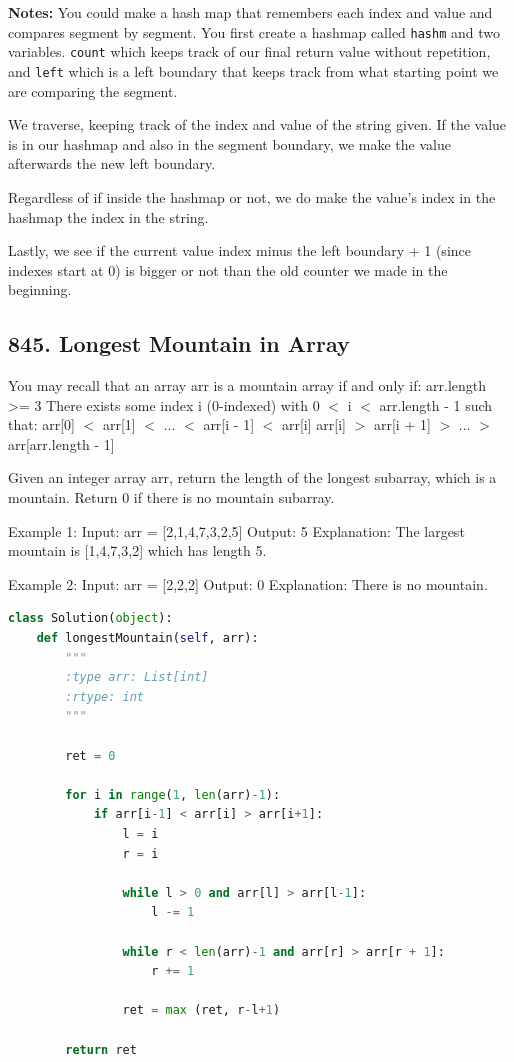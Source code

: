 \documentclass[11pt]{article}
\begin{document}
\noindent \textbf{Notes:} You could make a hash map that remembers each index and value and compares segment by segment. You first create a hashmap called \texttt{hashm} and two variables. \texttt{count} which keeps track of our final return value without repetition, and \texttt{left} which is a left boundary that keeps track from what starting point we are comparing the segment.

\noindent We traverse, keeping track of the index and value of the string given. If the value is in our hashmap and also in the segment boundary, we make the value afterwards the new left boundary.

\noindent Regardless of if inside the hashmap or not, we do make the value's index in the hashmap the index in the string. 

\noindent Lastly, we see if the current value index minus the left boundary + 1 (since indexes start at 0) is bigger or not than the old counter we made in the beginning. 


\subsection*{845. Longest Mountain in Array}
You may recall that an array arr is a mountain array if and only if: arr.length >= 3
There exists some index i (0-indexed) with 0 $<$ i $<$ arr.length - 1 such that:
        arr[0] $<$ arr[1] $<$ ... $<$ arr[i - 1] $<$ arr[i]
        arr[i] $>$ arr[i + 1] $>$ ... $>$ arr[arr.length - 1]

Given an integer array arr, return the length of the longest subarray, which is a mountain. Return 0 if there is no mountain subarray.

 

Example 1:
Input: arr = [2,1,4,7,3,2,5]
Output: 5
Explanation: The largest mountain is [1,4,7,3,2] which has length 5.

Example 2:
Input: arr = [2,2,2]
Output: 0
Explanation: There is no mountain.

\begin{lstlisting}[language=python, mathescape=true]
class Solution(object):
    def longestMountain(self, arr):
        """
        :type arr: List[int]
        :rtype: int
        """
        
        ret = 0

        for i in range(1, len(arr)-1):
            if arr[i-1] < arr[i] > arr[i+1]:
                l = i
                r = i

                while l > 0 and arr[l] > arr[l-1]:
                    l -= 1

                while r < len(arr)-1 and arr[r] > arr[r + 1]:
                    r += 1

                ret = max (ret, r-l+1)

        return ret
\end{lstlisting}
\end{document}
